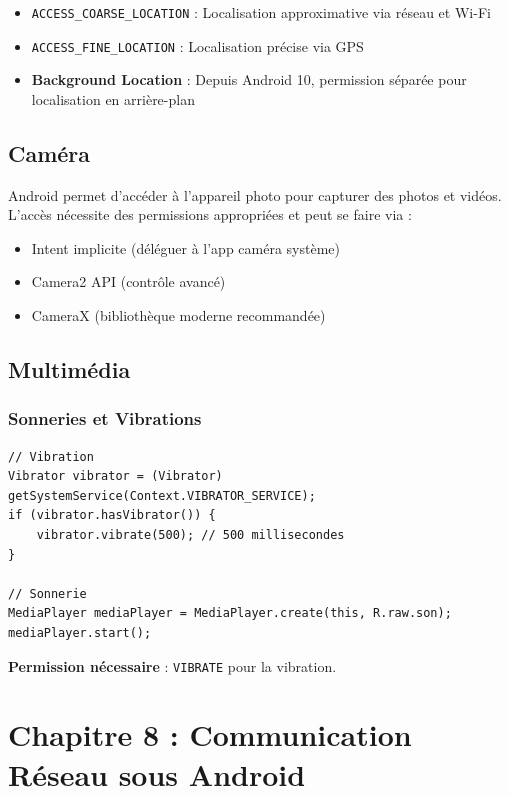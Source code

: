 \documentclass[11pt,a4paper]{article}
\begin{document}
\begin{itemize}
    \item \texttt{ACCESS\_COARSE\_LOCATION} : Localisation approximative via réseau et Wi-Fi
    \item \texttt{ACCESS\_FINE\_LOCATION} : Localisation précise via GPS
    \item \textbf{Background Location} : Depuis Android 10, permission séparée pour localisation en arrière-plan
\end{itemize}

\subsection{Caméra}

Android permet d'accéder à l'appareil photo pour capturer des photos et vidéos. L'accès nécessite des permissions appropriées et peut se faire via :
\begin{itemize}
    \item Intent implicite (déléguer à l'app caméra système)
    \item Camera2 API (contrôle avancé)
    \item CameraX (bibliothèque moderne recommandée)
\end{itemize}

\subsection{Multimédia}

\subsubsection{Sonneries et Vibrations}

\begin{lstlisting}
// Vibration
Vibrator vibrator = (Vibrator) getSystemService(Context.VIBRATOR_SERVICE);
if (vibrator.hasVibrator()) {
    vibrator.vibrate(500); // 500 millisecondes
}

// Sonnerie
MediaPlayer mediaPlayer = MediaPlayer.create(this, R.raw.son);
mediaPlayer.start();
\end{lstlisting}

\textbf{Permission nécessaire} : \texttt{VIBRATE} pour la vibration.


\section{Chapitre 8 : Communication Réseau sous Android}
\end{document}
